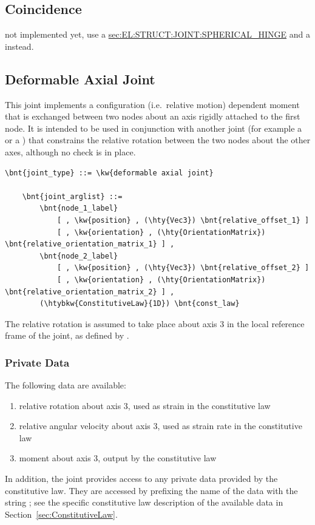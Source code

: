 \subsection{Coincidence}
not implemented yet, use a
\hyperref{\kw{spherical hinge}}{\kw{spherical hinge} (see Section~}{)}{sec:EL:STRUCT:JOINT:SPHERICAL_HINGE}
and a  
instead.




\subsection{Deformable Axial Joint}
\label{sec:EL:JOINT:DEFORMABLEAXIAL}
This joint implements a configuration (i.e.\ relative motion) dependent moment that is exchanged
between two nodes about an axis rigidly attached to the first node.
It is intended to be used in conjunction with another joint (for example a  or a )
that constrains the relative rotation between the two nodes about the other axes,
although no check is in place.
\begin{Verbatim}[commandchars=\\\{\}]
    \bnt{joint_type} ::= \kw{deformable axial joint}

    \bnt{joint_arglist} ::= 
        \bnt{node_1_label}
            [ , \kw{position} , (\hty{Vec3}) \bnt{relative_offset_1} ]
            [ , \kw{orientation} , (\hty{OrientationMatrix}) \bnt{relative_orientation_matrix_1} ] ,
        \bnt{node_2_label}
            [ , \kw{position} , (\hty{Vec3}) \bnt{relative_offset_2} ]
            [ , \kw{orientation} , (\hty{OrientationMatrix}) \bnt{relative_orientation_matrix_2} ] ,
        (\htybkw{ConstitutiveLaw}{1D}) \bnt{const_law}
\end{Verbatim}
The relative rotation is assumed to take place about axis 3 in the local reference frame of the joint,
as defined by .

\subsubsection{Private Data}
The following data are available:
\begin{enumerate}
\item {} relative rotation about axis 3, used as strain in the constitutive law
\item {} relative angular velocity about axis 3, used as strain rate in the constitutive law
\item {} moment about axis 3, output by the constitutive law
\end{enumerate}
In addition, the joint provides
access to any private data provided by the constitutive law.
They are accessed by prefixing the name of the data with the string
; see the specific constitutive law
description of the available data in Section~\ref{sec:ConstitutiveLaw}.


